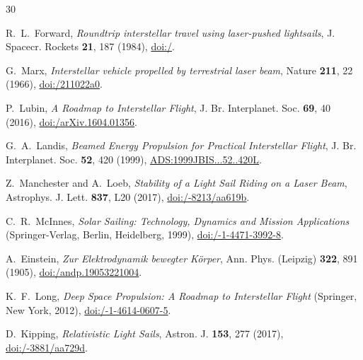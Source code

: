 \documentclass[aps,prd,reprint,superscriptaddress,nofootinbib,floatfix]{revtex4-2}
\begin{document}
\begingroup
\sloppy
\fontsize{9.0pt}{11.4pt}\selectfont
\begin{thebibliography}{30}
\fontsize{7.5pt}{8.8pt}\selectfont
\setlength{\itemsep}{-2.5pt plus 0.2pt}
\setlength{\parskip}{0pt}

 R.~L.~Forward, \textit{Roundtrip interstellar travel using laser-pushed lightsails}, J. Spacecr. Rockets \textbf{21}, 187 (1984), \href{https://doi.org/10.2514/3.8632}{doi:/}.

 G.~Marx, \textit{Interstellar vehicle propelled by terrestrial laser beam}, Nature \textbf{211}, 22 (1966), \href{https://doi.org/10.1038/211022a0}{doi:/\allowbreak 211022a0}.

 P.~Lubin, \textit{A Roadmap to Interstellar Flight}, J. Br. Interplanet. Soc. \textbf{69}, 40 (2016), \href{https://doi.org/10.48550/arXiv.1604.01356}{doi:/\allowbreak arXiv.1604.01356}.

 G.~A.~Landis, \textit{Beamed Energy Propulsion for Practical Interstellar Flight}, J. Br. Interplanet. Soc. \textbf{52}, 420 (1999), \href{https://ui.adsabs.harvard.edu/abs/1999JBIS...52..420L/abstract}{ADS:1999JBIS...52..420L}.

 Z.~Manchester and A.~Loeb, \textit{Stability of a Light Sail Riding on a Laser Beam}, Astrophys. J. Lett. \textbf{837}, L20 (2017), \href{https://doi.org/10.3847/2041-8213/aa619b}{doi:/-8213/\allowbreak aa619b}.

 C.~R.~McInnes, \textit{Solar Sailing: Technology, Dynamics and Mission Applications} (Springer-Verlag, Berlin, Heidelberg, 1999), \href{https://doi.org/10.1007/978-1-4471-3992-8}{doi:/-1-4471-3992-8}.

 A.~Einstein, \textit{Zur Elektrodynamik bewegter K{\"o}rper}, Ann. Phys. (Leipzig) \textbf{322}, 891 (1905), \href{https://doi.org/10.1002/andp.19053221004}{doi:/\allowbreak andp.19053221004}.

 K.~F.~Long, \textit{Deep Space Propulsion: A Roadmap to Interstellar Flight} (Springer, New York, 2012), \href{https://doi.org/10.1007/978-1-4614-0607-5}{doi:/-1-4614-0607-5}.

 D.~Kipping, \textit{Relativistic Light Sails}, Astron. J. \textbf{153}, 277 (2017), \href{https://doi.org/10.3847/1538-3881/aa729d}{doi:/-3881/\allowbreak aa729d}.


\end{thebibliography}
\end{document}
